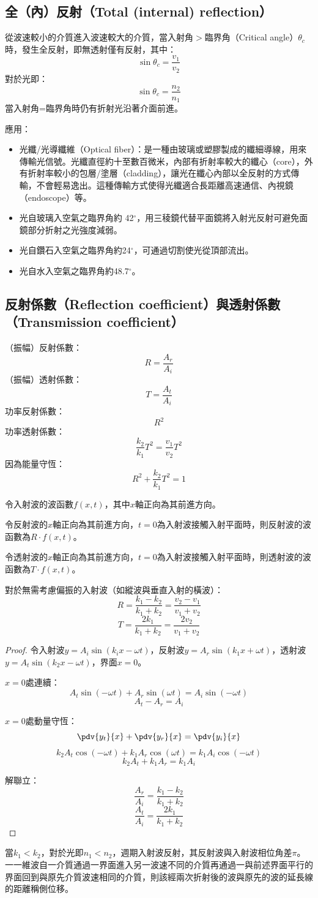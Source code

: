\documentclass[a4paper,12pt]{report}
\begin{document}
\subsection{全（內）反射（Total (internal) reflection）}
從波速較小的介質進入波速較大的介質，當入射角$>$臨界角（Critical angle）$\theta_c$時，發生全反射，即無透射僅有反射，其中：
\[ \sin \theta_c = \frac{v_1}{v_2} \]
對於光即：
\[ \sin \theta_c = \frac{n_2}{n_1} \]
當入射角=臨界角時仍有折射光沿著介面前進。

應用：
\begin{itemize}
\item 光纖/光導纖維（Optical fiber）：是一種由玻璃或塑膠製成的纖細導線，用來傳輸光信號。光纖直徑約十至數百微米，內部有折射率較大的纖心（core），外有折射率較小的包層/塗層（cladding），讓光在纖心內部以全反射的方式傳輸，不會輕易逸出。這種傳輸方式使得光纖適合長距離高速通信、內視鏡（endoscope）等。
\item 光自玻璃入空氣之臨界角約 42$^\circ$，用三稜鏡代替平面鏡將入射光反射可避免面鏡部分折射之光強度減弱。
\item 光自鑽石入空氣之臨界角約24$^\circ$，可通過切割使光從頂部流出。
\item 光自水入空氣之臨界角約48.7$^\circ$。
\end{itemize}
\subsection{反射係數（Reflection coefficient）與透射係數（Transmission coefficient）}
（振幅）反射係數：
\[ R = \frac{A_r}{A_i} \]
（振幅）透射係數：
\[ T = \frac{A_t}{A_i} \]
功率反射係數：
\[ R^2 \]
功率透射係數：
\[ \frac{k_2}{k_1}T^2=\frac{v_1}{v_2}T^2\]
因為能量守恆：
\[ R^2 + \frac{k_2}{k_1}T^2 = 1 \]

令入射波的波函數$f(x,t)$，其中$x$軸正向為其前進方向。

令反射波的$x$軸正向為其前進方向，$t=0$為入射波接觸入射平面時，則反射波的波函數為$R\cdot f(x,t)$。

令透射波的$x$軸正向為其前進方向，$t=0$為入射波接觸入射平面時，則透射波的波函數為$T\cdot f(x,t)$。

對於無需考慮偏振的入射波（如縱波與垂直入射的橫波）：
\[ R = \frac{k_1-k_2}{k_1+k_2} = \frac{v_2-v_1}{v_1+v_2} \]
\[ T = \frac{2k_1}{k_1+k_2} = \frac{2v_2}{v_1+v_2} \]
\begin{proof}
令入射波$y=A_i\sin(k_ix-\omega t)$，反射波$y=A_r\sin(k_1x+\omega t)$，透射波$y=A_t\sin(k_2x-\omega t)$，界面$x=0$。

$x=0$處連續：
\[A_t\sin(-\omega t)+A_r\sin(\omega t)=A_i\sin(-\omega t)\]
\[A_t-A_r=A_i\]

$x=0$處動量守恆：
\[\pdv{y_t}{x}+\pdv{y_r}{x}=\pdv{y_i}{x}\]
\[k_2A_t\cos(-\omega t)+k_1A_r\cos(\omega t)=k_1A_i\cos(-\omega t)\]
\[k_2A_t+k_1A_r=k_1A_i\]

解聯立：
\[ \frac{A_r}{A_i} = \frac{k_1-k_2}{k_1+k_2} \]
\[ \frac{A_t}{A_i} = \frac{2k_1}{k_1+k_2} \]
\end{proof}
當$k_1<k_2$，對於光即$n_1<n_2$，週期入射波反射，其反射波與入射波相位角差$\pi$。
一一維波自一介質通過一界面進入另一波速不同的介質再通過一與前述界面平行的界面回到與原先介質波速相同的介質，則該經兩次折射後的波與原先的波的延長線的距離稱側位移。
\end{document}
